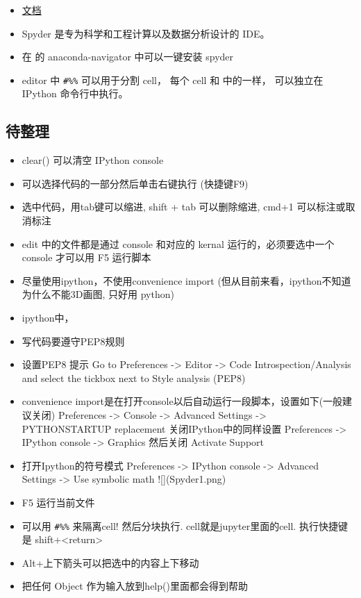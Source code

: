 
\begin{issues}
\issueDraft
\end{issues}

\begin{itemize}
\item \href{https://docs.spyder-ide.org/current/}{文档}
\item Spyder 是专为科学和工程计算以及数据分析设计的 IDE。
\item 在  的 anaconda-navigator 中可以一键安装 spyder
\item editor 中 \verb`#%%` 可以用于分割 cell， 每个 cell 和  中的一样， 可以独立在 IPython 命令行中执行。
\end{itemize}

\subsection{待整理}
\begin{itemize}
\item clear() 可以清空 IPython console
\item 可以选择代码的一部分然后单击右键执行 (快捷键F9)
\item 选中代码，用tab键可以缩进, shift + tab 可以删除缩进, cmd+1 可以标注或取消标注
\item edit 中的文件都是通过 console 和对应的 kernal 运行的，必须要选中一个 console 才可以用 F5 运行脚本
\item 尽量使用ipython，不使用convenience import (但从目前来看，ipython不知道为什么不能3D画图, 只好用 python)
\item ipython中，%
\item 写代码要遵守PEP8规则
\item 设置PEP8 提示
  Go to Preferences -> Editor -> Code Introspection/Analysis and select the tickbox next to Style analysis (PEP8)
\item convenience import是在打开console以后自动运行一段脚本，设置如下(一般建议关闭)
   Preferences -> Console -> Advanced Settings -> PYTHONSTARTUP replacement
   关闭IPython中的同样设置
   Preferences -> IPython console -> Graphics 然后关闭 Activate Support
\item 打开Ipython的符号模式
   Preferences -> IPython console -> Advanced Settings -> Use symbolic math
![](Spyder1.png)

\item F5 运行当前文件
\item 可以用 \verb`#%%` 来隔离cell! 然后分块执行. cell就是jupyter里面的cell. 执行快捷键是 shift+<return>
\item Alt+上下箭头可以把选中的内容上下移动
\item 把任何 Object 作为输入放到help()里面都会得到帮助
\end{itemize}
